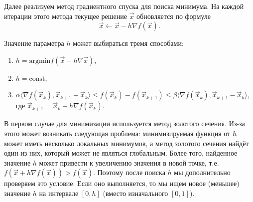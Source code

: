 \documentclass[11pt]{article}
\begin{document}
    Далее реализуем метод градиентного спуска для поиска минимума. На каждой
итерации этого метода текущее решение \(\vec{x}\) обновляется по формуле
\begin{equation*}
    \vec{x} \leftarrow \vec{x} - h \nabla f(\vec{x}).
\end{equation*}

Значение параметра \(h\) может выбираться тремя способами:
\begin{enumerate}
\item \(h = \text{argmin}{f(\vec{x} - h \nabla \vec{x})}\),
\item \(h = \text{const}\),
\item \(\alpha \langle \nabla f(\vec{x}_k), \vec{x}_{k+1} - \vec{x}_k \rangle \leqslant f(\vec{x}_k) - f(\vec{x}_{k+1}) \leqslant \beta \langle \nabla f(\vec{x}_k), \vec{x}_{k+1} - \vec{x}_k \rangle\),
где \(\vec{x}_{k+1} = \vec{x}_k - h \nabla f(\vec{x}_k)\).
\end{enumerate}

В первом случае для минимизации используется метод золотого сечения.
Из-за этого может возникать следующая проблема: минимизируемая функция
от \(h\) может иметь несколько локальных минимумов, а метод золотого
сечения найдёт один из них, который может не являться глобальным. Более
того, найденное значение \(h\) может привести к увеличению значения в
новой точке, т.е. \(f(\vec{x} + h \nabla f(\vec{x})) > f(\vec{x})\).
Поэтому после поиска \(h\) мы дополнительно проверяем это условие. Если
оно выполняется, то мы ищем новое (меньшее) значение \(h\) на интервале
\([0, h]\) (вместо изначального \([0, 1]\)).
\end{document}
